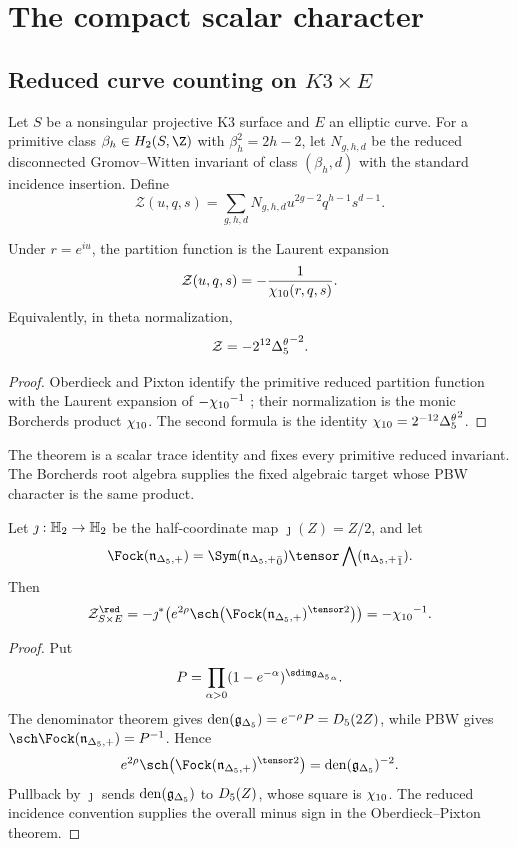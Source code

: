 \part{The compact scalar character}

\chapter{Reduced curve counting on \texorpdfstring{$K3\times E$}{K3 x E}}
Let $S$ be a nonsingular projective K3 surface and $E$ an elliptic curve. For a primitive class $\beta_h\in H_2(S,\Z)$ with $\beta_h^2=2h-2$, let $N_{g,h,d}$ be the reduced disconnected Gromov--Witten invariant of class $(\beta_h,d)$ with the standard incidence insertion. Define
\[
 \mathcal Z(u,q,s)=
 \sum_{g,h,d}N_{g,h,d}u^{2g-2}q^{h-1}s^{d-1}.
\]

\begin{theorem}
Under $r=e^{iu}$, the partition function is the Laurent expansion
\[
 \mathcal Z(u,q,s)=-\frac1{{\chi_{10}}(r,q,s)}.
\]
Equivalently, in theta normalization,
\[
 \mathcal Z=-2^{12}{\Delta^{\theta}_5}^{-2}.
\]
\end{theorem}
\begin{proof}
Oberdieck and Pixton identify the primitive reduced partition function with the Laurent expansion of $-{\chi_{10}}^{-1}$ \cite{OP}; their normalization is the monic Borcherds product ${\chi_{10}}$. The second formula is the identity ${\chi_{10}}=2^{-12}{\Delta^{\theta}_5}^2$.
\end{proof}

The theorem is a scalar trace identity and fixes every primitive reduced invariant.  The Borcherds root algebra supplies the fixed algebraic target whose PBW character is the same product.

\begin{corollary}
Let $\jmath:\mathbb H_2\to\mathbb H_2$ be the half-coordinate map $\jmath(Z)=Z/2$, and let
\[
 \Fock(\nIg)=
 \Sym(\nIg_{\bar0})\tensor\bigwedge(\nIg_{\bar1}).
\]
Then
\[
 \mathcal Z^{\red}_{S\times E}
 =-\jmath^*\!\left(
 e^{2\rho}\sch\bigl(\Fock(\nIg)^{\tensor2}\bigr)
 \right)
 =-\ChiTen^{-1}.
\]
\end{corollary}
\begin{proof}
Put
\[
 P=\prod_{\alpha>0}(1-e^{-\alpha})^{\sdim\gIg_\alpha}.
\]
The denominator theorem gives $\operatorname{den}({\mathfrak g_{\Delta_5}})=e^{-\rho}P={D_5}(2Z)$, while PBW gives $\sch\Fock(\nIg)=P^{-1}$.  Hence
\[
 e^{2\rho}\sch\bigl(\Fock(\nIg)^{\tensor2}\bigr)
 =\den(\gIg)^{-2}.
\]
Pullback by $\jmath$ sends $\operatorname{den}({\mathfrak g_{\Delta_5}})$ to ${D_5}(Z)$, whose square is ${\chi_{10}}$.  The reduced incidence convention supplies the overall minus sign in the Oberdieck--Pixton theorem.
\end{proof}

